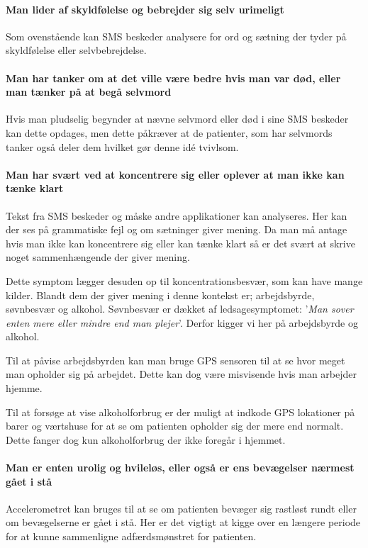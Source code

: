 \paragraph{Man lider af skyldfølelse og bebrejder sig selv urimeligt}
Som ovenstående kan SMS beskeder analysere for ord og sætning der tyder på skyldfølelse eller selvbebrejdelse.

\paragraph{Man har tanker om at det ville være bedre hvis man var død, eller man tænker på at begå selvmord}
Hvis man pludselig begynder at nævne selvmord eller død i sine SMS beskeder kan dette opdages, men dette påkræver at de patienter, som har selvmords tanker også deler dem hvilket gør denne idé tvivlsom.

\paragraph{Man har svært ved at koncentrere sig eller oplever at man ikke kan tænke klart}
Tekst fra SMS beskeder og måske andre applikationer kan analyseres. Her kan der ses på grammatiske fejl og om sætninger giver mening. Da man må antage hvis man ikke kan koncentrere sig eller kan tænke klart så er det svært at skrive noget sammenhængende der giver mening.

Dette symptom lægger desuden op til koncentrationsbesvær, som kan have mange kilder. Blandt dem der giver mening i denne kontekst er; arbejdsbyrde, søvnbesvær og alkohol\citep{koncentration}.
Søvnbesvær er dækket af ledsagesymptomet: '\textit{Man sover enten mere eller mindre end man plejer}'. Derfor kigger vi her på arbejdsbyrde og alkohol.

Til at påvise arbejdsbyrden kan man bruge GPS sensoren til at se hvor meget man opholder sig på arbejdet. Dette kan dog være misvisende hvis man arbejder hjemme.

Til at forsøge at vise alkoholforbrug er der muligt at indkode GPS lokationer på barer og værtshuse for at se om patienten opholder sig der mere end normalt.
Dette fanger dog kun alkoholforbrug der ikke foregår i hjemmet.

\paragraph{Man er enten urolig og hvileløs, eller også er ens bevægelser nærmest gået i stå}
Accelerometret kan bruges til at se om patienten bevæger sig rastløst rundt eller om bevægelserne er gået i stå.
Her er det vigtigt at kigge over en længere periode for at kunne sammenligne adfærdsmønstret for patienten.


